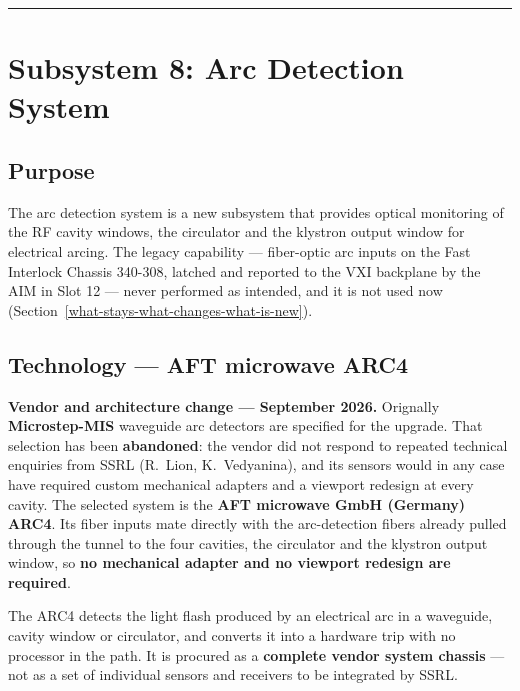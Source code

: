 \begin{center}\rule{0.5\linewidth}{0.5pt}\end{center}

\section{Subsystem 8: Arc Detection System}\label{subsystem-8-arc-detection-system}

\subsection{Purpose}\label{arc-purpose}

The arc detection system is a new subsystem that provides optical monitoring of the RF cavity windows, the circulator and the klystron output window for electrical arcing. The legacy capability --- fiber-optic arc inputs on the Fast Interlock Chassis 340-308, latched and reported to the VXI backplane by the AIM in Slot 12 --- never performed as intended, and it is not used now (Section~\ref{what-stays-what-changes-what-is-new}).

\subsection{Technology --- AFT microwave ARC4}\label{arc-technology}

\begin{warnbox}
\textbf{Vendor and architecture change --- September 2026.} Orignally
\textbf{Microstep-MIS} waveguide arc detectors are specified for the upgrade. That
selection has been \textbf{abandoned}: the vendor did not respond to repeated
technical enquiries from SSRL (R.~Lion, K.~Vedyanina), and its sensors would in
any case have required custom mechanical adapters and a viewport redesign at
every cavity. The selected system is the \textbf{AFT microwave GmbH (Germany)
ARC4}. Its fiber inputs mate directly with the arc-detection fibers already
pulled through the tunnel to the four cavities, the circulator and the klystron
output window, so \textbf{no mechanical adapter and no viewport redesign are
required}. 
\end{warnbox}

The ARC4 detects the light flash produced by an electrical arc in a waveguide, cavity window or circulator, and converts it into a hardware trip with no processor in the path. It is procured as a \textbf{complete vendor system chassis} --- not as a set of individual sensors and receivers to be integrated by SSRL.

